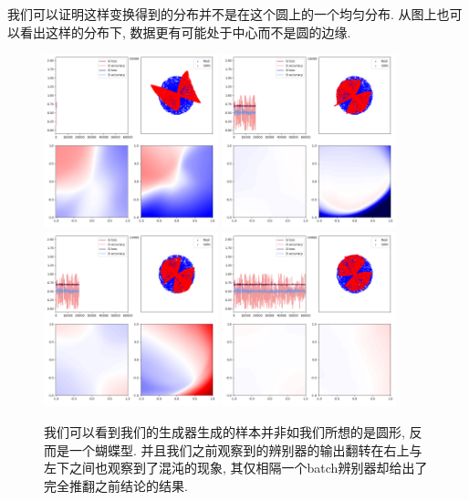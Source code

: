 \documentclass[lang=cn,11pt]{elegantpaper}
\begin{document}
我们可以证明这样变换得到的分布并不是在这个圆上的一个均匀分布. 从图上也可以看出这样的分布下, 数据更有可能处于中心而不是圆的边缘.

\begin{figure}[hbt]
  \includegraphics[width=0.45\textwidth]{circle_2_1}
  \includegraphics[width=0.45\textwidth]{circle_2_2}\\
  \includegraphics[width=0.45\textwidth]{circle_2_3}
  \includegraphics[width=0.45\textwidth]{circle_2_4}
  \caption{我们可以看到我们的生成器生成的样本并非如我们所想的是圆形, 反而是一个蝴蝶型. 并且我们之前观察到的辨别器的输出翻转在右上与左下之间也观察到了混沌的现象, 其仅相隔一个batch辨别器却给出了完全推翻之前结论的结果.}
\end{figure}
\end{document}
